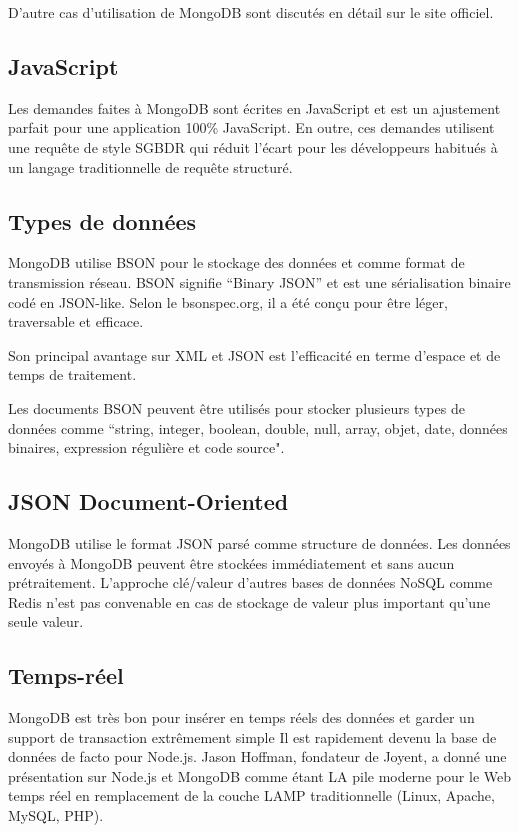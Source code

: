 D’autre cas d’utilisation de MongoDB sont discutés en détail sur le site officiel.

\subsection{JavaScript}

Les demandes faites à MongoDB sont écrites en JavaScript et est un ajustement parfait pour une application 100\% JavaScript. En outre, ces demandes utilisent une requête de style SGBDR qui réduit l’écart pour les développeurs habitués à un langage traditionnelle de requête structuré.

\subsection{Types de données}

MongoDB utilise BSON pour le stockage des données et comme format de transmission réseau. BSON signifie “Binary JSON” et est une sérialisation binaire codé en JSON-like.
Selon le bsonspec.org, il a été conçu pour être léger, traversable et efficace.

Son principal avantage sur XML et JSON est l’efficacité en terme d’espace et de temps de traitement.

Les documents BSON peuvent être utilisés pour stocker plusieurs types de données comme “string, integer, boolean, double, null, array, objet, date, données binaires, expression régulière et code source".

\subsection{JSON Document-Oriented}

MongoDB utilise le format JSON parsé comme structure de données. Les données envoyés à MongoDB peuvent être stockées immédiatement et sans aucun prétraitement. L’approche clé/valeur d’autres bases de données NoSQL comme Redis n’est pas convenable en cas de stockage de valeur plus important qu’une seule valeur.

\subsection{Temps-réel}

MongoDB est très bon pour insérer en temps réels des données et garder un support de transaction extrêmement simple
Il est rapidement devenu la base de données de facto pour Node.js. Jason Hoffman, fondateur de Joyent, a donné une présentation sur Node.js et MongoDB comme étant LA pile moderne pour le Web temps  réel en remplacement de la couche LAMP traditionnelle (Linux, Apache, MySQL, PHP).

